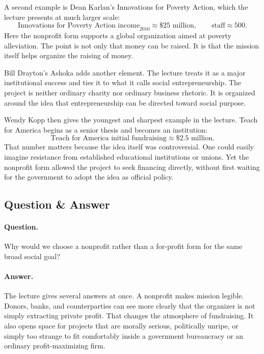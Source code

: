 A second example is Dean Karlan's Innovations for Poverty Action, which the lecture presents at much larger scale:
\begin{equation}
\text{Innovations for Poverty Action income}_{2010} \approx \$25\text{ million},
\qquad
\text{staff} \approx 500.
\end{equation}
Here the nonprofit form supports a global organization aimed at poverty alleviation. The point is not only that money can be raised. It is that the mission itself helps organize the raising of money.

Bill Drayton's Ashoka adds another element. The lecture treats it as a major institutional success and ties it to what it calls social entrepreneurship. The project is neither ordinary charity nor ordinary business rhetoric. It is organized around the idea that entrepreneurship can be directed toward social purpose.

Wendy Kopp then gives the youngest and sharpest example in the lecture. Teach for America begins as a senior thesis and becomes an institution:
\begin{equation}
\text{Teach for America initial fundraising} \approx \$2.5\text{ million}.
\end{equation}
That number matters because the idea itself was controversial. One could easily imagine resistance from established educational institutions or unions. Yet the nonprofit form allowed the project to seek financing directly, without first waiting for the government to adopt the idea as official policy.

\subsection{Question \& Answer}

\paragraph{Question.} Why would we choose a nonprofit rather than a for-profit form for the same broad social goal?

\paragraph{Answer.} The lecture gives several answers at once. A nonprofit makes mission legible. Donors, banks, and counterparties can see more clearly that the organizer is not simply extracting private profit. That changes the atmosphere of fundraising. It also opens space for projects that are morally serious, politically unripe, or simply too strange to fit comfortably inside a government bureaucracy or an ordinary profit-maximizing firm.

